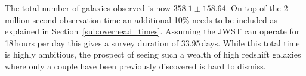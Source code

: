 	The total number of galaxies observed is now $358.1 \pm 158.64$. On top of the 2\,million second observation time an additional 10\% needs to be included as explained in Section~\ref{sub:overhead_times}. Assuming the JWST can operate for 18\,hours per day this gives a survey duration of 33.95\,days. While this total time is highly ambitious, the prospect of seeing such a wealth of high redshift galaxies where only a couple have been previously discovered is hard to dismiss.

